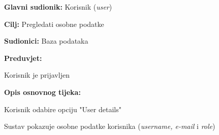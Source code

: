 				\noindent {}
				\begin{packed_item}
					
					\item \textbf{Glavni sudionik: }Korisnik (\textit{user})
					\item  \textbf{Cilj: }Pregledati osobne podatke
					\item  \textbf{Sudionici: }Baza podataka
				\item  \textbf{Preduvjet: }
				\begin{packed_enum}\item Korisnik je prijavljen\end{packed_enum}
					\item  \textbf{Opis osnovnog tijeka: }
					
					\item[] \begin{packed_enum}
					
						\item Korisnik odabire opciju "User details"
						\item Sustav pokazuje osobne podatke korisnika (\textit{username, e-mail} i \textit{ role})
						
					\end{packed_enum}
				\end{packed_item}
				
